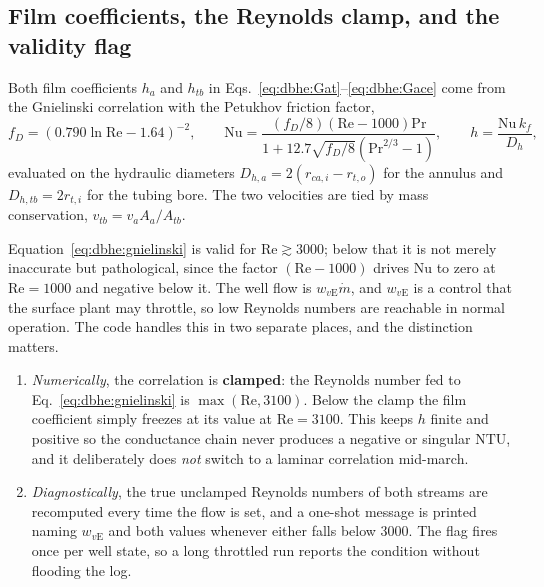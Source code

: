 \documentclass[11pt]{article}
\begin{document}
\subsection{Film coefficients, the Reynolds clamp, and the validity flag}
\label{sec:dbhe:reynolds}

Both film coefficients $h_a$ and $h_{tb}$ in
Eqs.~\eqref{eq:dbhe:Gat}--\eqref{eq:dbhe:Gace} come from the Gnielinski
correlation with the Petukhov friction factor,
\begin{equation}
f_D=\left(0.790\ln\mathrm{Re}-1.64\right)^{-2}, \qquad
\mathrm{Nu}=\frac{(f_D/8)\left(\mathrm{Re}-1000\right)\mathrm{Pr}}
{1+12.7\sqrt{f_D/8}\left(\mathrm{Pr}^{2/3}-1\right)}, \qquad h=\frac{\mathrm{Nu}\,k_f}{D_h},
\label{eq:dbhe:gnielinski}
\end{equation}
evaluated on the hydraulic diameters $D_{h,a}=2(r_{ca,i}-r_{t,o})$ for the
annulus and $D_{h,tb}=2r_{t,i}$ for the tubing bore. The two velocities are tied
by mass conservation, $v_{tb}=v_a A_a/A_{tb}$.

Equation~\eqref{eq:dbhe:gnielinski} is valid for $\mathrm{Re}\gtrsim3000$; below
that it is not merely inaccurate but pathological, since the factor
$(\mathrm{Re}-1000)$ drives $\mathrm{Nu}$ to zero at $\mathrm{Re}=1000$ and
negative below it. The well flow is $w_{v\mathrm{E}}\dot m$, and
$w_{v\mathrm{E}}$ is a control that the surface plant may throttle, so low
Reynolds numbers are reachable in normal operation. The code handles this in two
separate places, and the distinction matters.

\begin{enumerate}[leftmargin=*]
\item \emph{Numerically}, the correlation is \textbf{clamped}: the Reynolds
number fed to Eq.~\eqref{eq:dbhe:gnielinski} is $\max(\mathrm{Re},3100)$. Below
the clamp the film coefficient simply freezes at its value at
$\mathrm{Re}=3100$. This keeps $h$ finite and positive so the conductance chain
never produces a negative or singular $\mathrm{NTU}$, and it deliberately does
\emph{not} switch to a laminar correlation mid-march.
\item \emph{Diagnostically}, the true unclamped Reynolds numbers of both streams
are recomputed every time the flow is set, and a one-shot message is printed
naming $w_{v\mathrm{E}}$ and both values whenever either falls below $3000$. The
flag fires once per well state, so a long throttled run reports the condition
without flooding the log.
\end{enumerate}
\end{document}
